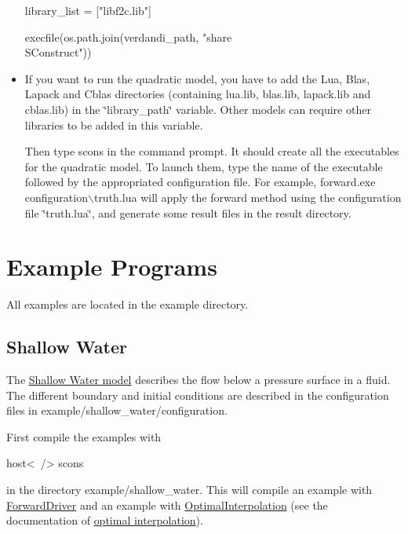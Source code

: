 \documentclass{tufte-book}
\begin{document}
\begin{itemize}
\begin{frame_python}
library_list = ["libf2c.lib"]

execfile(os.path.join(verdandi_path, "share\\SConstruct"))
\end{frame_python}



\item \-If you want to run the quadratic model, you have to add the \-Lua, \-Blas, \-Lapack and \-Cblas directories (containing lua.\-lib, blas.\-lib, lapack.\-lib and cblas.\-lib) in the \char`\"{}library\-\_\-path\char`\"{} variable. \-Other models can require other libraries to be added in this variable.

\-Then type {\ttfamily scons} in the command prompt. \-It should create all the executables for the quadratic model. \-To launch them, type the name of the executable followed by the appropriated configuration file. \-For example, {\ttfamily forward.\-exe configuration$\backslash$truth.\-lua} will apply the forward method using the configuration file \char`\"{}truth.\-lua\char`\"{}, and generate some result files in the {\ttfamily result} directory.
\end{itemize}






\hypertarget{example_programs}{}\section{Example Programs}\label{example_programs}

\-All examples are located in the {\ttfamily example} directory.

\hypertarget{example_programs_shallow_water}{}\subsection{\-Shallow Water}\label{example_programs_shallow_water}

\-The \hyperlink{shallow_water}{\-Shallow \-Water model} describes the flow below a pressure surface in a fluid. \-The different boundary and initial conditions are described in the configuration files in {\ttfamily example/shallow\-\_\-water/configuration}.

\-First compile the examples with
\begin{frame_bash}
host<~/> scons
\end{frame_bash}
  in the directory {\ttfamily example/shallow\-\_\-water}. \-This will compile an example with {\ttfamily  \hyperlink{class_verdandi_1_1_forward_driver}{\-Forward\-Driver}} and an example with {\ttfamily  \hyperlink{class_verdandi_1_1_optimal_interpolation}{\-Optimal\-Interpolation}} (see the documentation of \hyperlink{optimal_interpolation}{optimal interpolation}).
\end{document}
